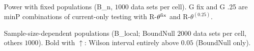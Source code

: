 \begin{table}[H]
\centering\scriptsize\setlength{\tabcolsep}{2.6pt}
\caption{Power with fixed populations (B\_n, $1000$ data sets per cell). G fix and G .25 are minP combinations of current-only testing with R-$\theta^{\rm fix}$ and R-$\theta^{(0.25)}$.}\label{tab:Bpower}

\end{table}

\begin{table}[H]
\centering\scriptsize\setlength{\tabcolsep}{2.6pt}
\caption{Sample-size-dependent populations (B\_local; BoundNull $2000$ data sets per cell, others $1000$). Bold with $\uparrow$: Wilson interval entirely above $0.05$ (BoundNull only).}\label{tab:Blocal}

\end{table}

